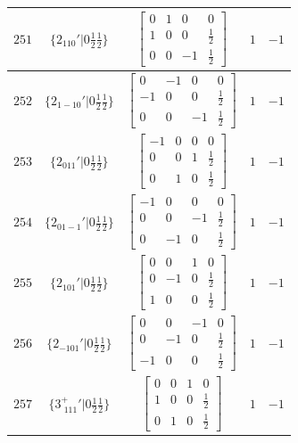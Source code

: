\documentclass[fleqn,8pt]{jsarticle}
\begin{document}
\begin{longtable}{ccccc}
$ 251 $ & $ \{2{}_{110}{}'|0 \frac{1}{2} \frac{1}{2}\} $ & $ \begin{bmatrix} 0 & 1 & 0 & 0 \\ 1 & 0 & 0 & \frac{1}{2} \\ 0 & 0 & -1 & \frac{1}{2} \end{bmatrix} $ & $ 1 $ & $ -1 $ \\ \hline
$ 252 $ & $ \{2{}_{1-10}{}'|0 \frac{1}{2} \frac{1}{2}\} $ & $ \begin{bmatrix} 0 & -1 & 0 & 0 \\ -1 & 0 & 0 & \frac{1}{2} \\ 0 & 0 & -1 & \frac{1}{2} \end{bmatrix} $ & $ 1 $ & $ -1 $ \\ \hline
$ 253 $ & $ \{2{}_{011}{}'|0 \frac{1}{2} \frac{1}{2}\} $ & $ \begin{bmatrix} -1 & 0 & 0 & 0 \\ 0 & 0 & 1 & \frac{1}{2} \\ 0 & 1 & 0 & \frac{1}{2} \end{bmatrix} $ & $ 1 $ & $ -1 $ \\ \hline
$ 254 $ & $ \{2{}_{01-1}{}'|0 \frac{1}{2} \frac{1}{2}\} $ & $ \begin{bmatrix} -1 & 0 & 0 & 0 \\ 0 & 0 & -1 & \frac{1}{2} \\ 0 & -1 & 0 & \frac{1}{2} \end{bmatrix} $ & $ 1 $ & $ -1 $ \\ \hline
$ 255 $ & $ \{2{}_{101}{}'|0 \frac{1}{2} \frac{1}{2}\} $ & $ \begin{bmatrix} 0 & 0 & 1 & 0 \\ 0 & -1 & 0 & \frac{1}{2} \\ 1 & 0 & 0 & \frac{1}{2} \end{bmatrix} $ & $ 1 $ & $ -1 $ \\ \hline
$ 256 $ & $ \{2{}_{-101}{}'|0 \frac{1}{2} \frac{1}{2}\} $ & $ \begin{bmatrix} 0 & 0 & -1 & 0 \\ 0 & -1 & 0 & \frac{1}{2} \\ -1 & 0 & 0 & \frac{1}{2} \end{bmatrix} $ & $ 1 $ & $ -1 $ \\ \hline
$ 257 $ & $ \{3^{+}_{\,\,111}{}'|0 \frac{1}{2} \frac{1}{2}\} $ & $ \begin{bmatrix} 0 & 0 & 1 & 0 \\ 1 & 0 & 0 & \frac{1}{2} \\ 0 & 1 & 0 & \frac{1}{2} \end{bmatrix} $ & $ 1 $ & $ -1 $ \\ \hline

\end{longtable}
\end{document}
